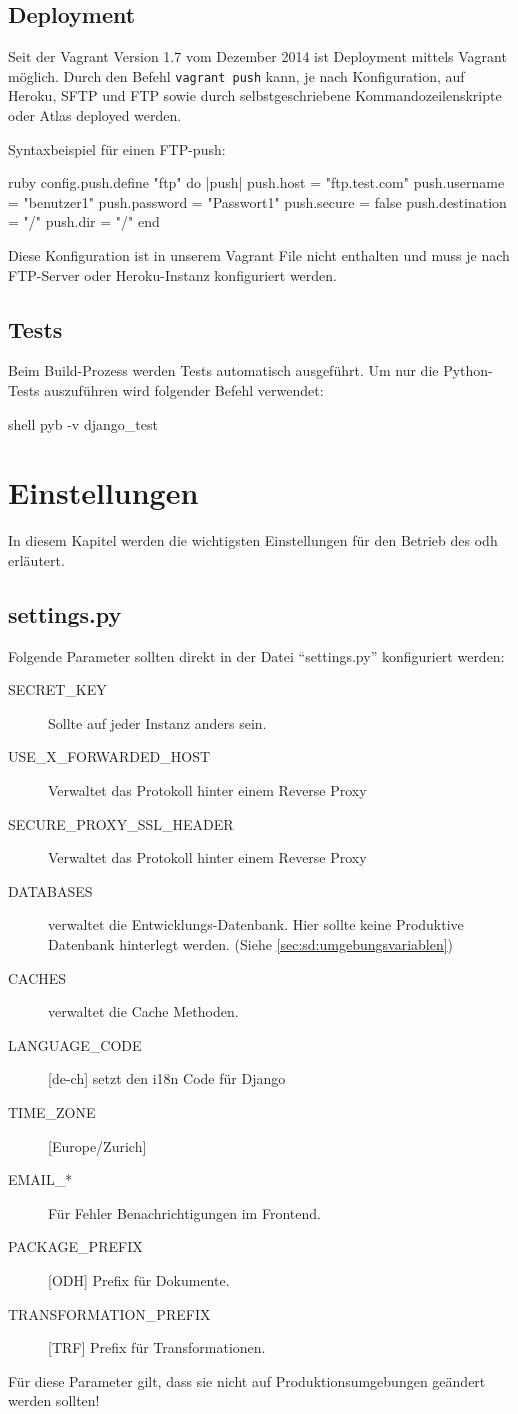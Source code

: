 \subsection{Deployment}
Seit der Vagrant Version 1.7 vom Dezember 2014 ist Deployment mittels Vagrant möglich. Durch den Befehl \texttt{vagrant push} kann, je nach Konfiguration, auf Heroku, SFTP und FTP sowie durch selbstgeschriebene Kommandozeilenskripte oder Atlas deployed werden.

Syntaxbeispiel für einen FTP-push: \cite{vagrant-deployment}
\begin{src}{ruby}
config.push.define "ftp" do |push|
  push.host = "ftp.test.com"
  push.username = "benutzer1"
  push.password = "Passwort1"
  push.secure = false
  push.destination = "/"
  push.dir = "/"
end
\end{src}
Diese Konfiguration ist in unserem Vagrant File nicht enthalten und muss je nach FTP-Server oder Heroku-Instanz konfiguriert werden.

\subsection{Tests}
Beim Build-Prozess werden Tests automatisch ausgeführt. Um nur die Python-Tests auszuführen wird folgender Befehl verwendet:
\begin{src}{shell}
pyb -v django_test
\end{src}
\section{Einstellungen}
In diesem Kapitel werden die wichtigsten Einstellungen für den Betrieb des \ac{odh} erläutert.
\subsection{settings.py}
Folgende Parameter sollten direkt in der Datei ``settings.py'' konfiguriert werden:
\begin{description}
\item[SECRET\_KEY] Sollte auf jeder Instanz anders sein.
\item[USE\_X\_FORWARDED\_HOST] Verwaltet das Protokoll hinter einem Reverse Proxy
\item[SECURE\_PROXY\_SSL\_HEADER] Verwaltet das Protokoll hinter einem Reverse Proxy
\item[DATABASES] verwaltet die Entwicklungs-Datenbank. Hier sollte keine Produktive Datenbank hinterlegt werden. (Siehe \cref{sec:sd:umgebungsvariablen})
\item[CACHES] verwaltet die Cache Methoden.
\item[LANGUAGE\_CODE]{[}de-ch{]} setzt den \acs{i18n} Code für Django
\item[TIME\_ZONE]{[}Europe/Zurich{]}

\item[EMAIL\_*] Für Fehler Benachrichtigungen im Frontend.
\item[PACKAGE\_PREFIX]{[}ODH{]} Prefix für Dokumente. 
\item[TRANSFORMATION\_PREFIX]{[}TRF{]} Prefix für Transformationen.
\end{description}
Für diese Parameter gilt, dass sie nicht auf Produktionsumgebungen geändert werden sollten!
